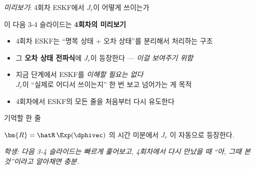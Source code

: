 \begin{frame}{\emph{미리보기}: 4회차 ESKF에서 $J_r$이 어떻게 쓰이는가}
  \begin{alertblock}{이 다음 3-4 슬라이드는 \textbf{4회차의 미리보기}}
    \begin{itemize}
      \item 4회차 ESKF는 ``명목 상태 + 오차 상태''를 분리해서 처리하는 구조
      \item 그 \textbf{오차 상태 전파식}에 $J_r$이 등장한다 — \emph{이걸 보여주기 위함}
      \item \alert{지금 단계에서 ESKF를 \emph{이해할 필요는 없다}}\\
            $J_r$이 ``실제로 어디서 쓰이는지'' 한 번 보고 넘어가는 게 목적
      \item 4회차에서 ESKF의 모든 줄을 처음부터 다시 유도한다
    \end{itemize}
  \end{alertblock}

  \pause
  \vspace{0.4em}
  \begin{exampleblock}{기억할 한 줄}
    \begin{center}
      $\bm{R} = \hatR\,\Exp(\dphivec)$ 의 시간 미분에서 \;\;$J_r$ \;\;이 자동으로 등장한다.
    \end{center}
  \end{exampleblock}

  \begin{center}\small\itshape\color{gray}
    학생: 다음 3-4 슬라이드는 \emph{빠르게 훑어}보고, 4회차에서 다시 만났을 때 ``아, 그때 본 것''이라고 알아채면 충분.
  \end{center}
\end{frame}

